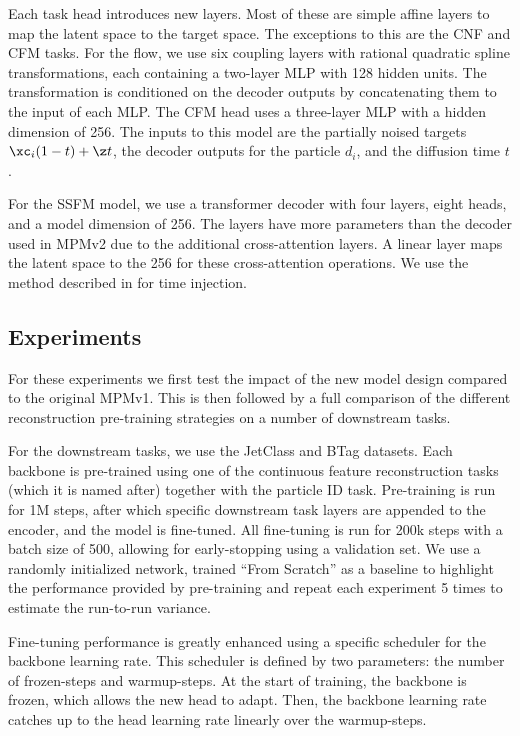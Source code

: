 Each task head introduces new layers.
Most of these are simple affine layers to map the latent space to the target space.
The exceptions to this are the CNF and CFM tasks.
For the flow, we use six coupling layers with rational quadratic spline transformations, each containing a two-layer MLP with 128 hidden units.
The transformation is conditioned on the decoder outputs by concatenating them to the input of each MLP.
The CFM head uses a three-layer MLP with a hidden dimension of 256.
The inputs to this model are the partially noised targets ${\xc_i}(1 - t) + \z t$, the decoder outputs for the particle $d_i$, and the diffusion time $t$.

For the SSFM model, we use a transformer decoder with four layers, eight heads, and a model dimension of 256.
The layers have more parameters than the decoder used in MPMv2 due to the additional cross-attention layers.
A linear layer maps the latent space to the 256 for these cross-attention operations.
We use the method described in \textcite{DIT} for time injection.

\subsection{Experiments}
\label{sec:mpm2_experiments}

For these experiments we first test the impact of the new model design compared to the original MPMv1.
This is then followed by a full comparison of the different reconstruction pre-training strategies on a number of downstream tasks.

For the downstream tasks, we use the JetClass and BTag datasets.
Each backbone is pre-trained using one of the continuous feature reconstruction tasks (which it is named after) together with the particle ID task.
Pre-training is run for 1M steps, after which specific downstream task layers are appended to the encoder, and the model is fine-tuned.
All fine-tuning is run for 200k steps with a batch size of 500, allowing for early-stopping using a validation set.
We use a randomly initialized network, trained ``From Scratch'' as a baseline to highlight the performance provided by pre-training and repeat each experiment 5 times to estimate the run-to-run variance.

Fine-tuning performance is greatly enhanced using a specific scheduler for the backbone learning rate.
This scheduler is defined by two parameters: the number of frozen-steps and warmup-steps.
At the start of training, the backbone is frozen, which allows the new head to adapt.
Then, the backbone learning rate catches up to the head learning rate linearly over the warmup-steps.

